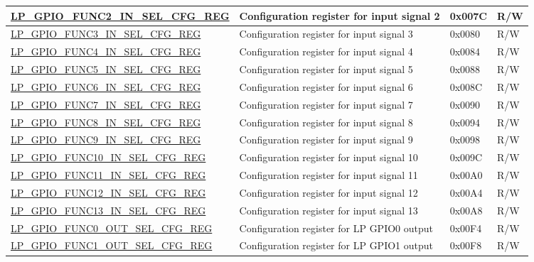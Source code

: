 \begin{longtable}{ | p{6.2cm} | p{6.9cm} | p{1.3cm} | p{1.8cm} | }
\hyperref[regdesc:LPGPIOFUNCNINSELCFGREG]{LP\_GPIO\_FUNC2\_IN\_SEL\_CFG\_REG} & Configuration register for input signal 2 & 0x007C & R/W \\ \hline
\hyperref[regdesc:LPGPIOFUNCNINSELCFGREG]{LP\_GPIO\_FUNC3\_IN\_SEL\_CFG\_REG} & Configuration register for input signal 3 & 0x0080 & R/W \\ \hline
\hyperref[regdesc:LPGPIOFUNCNINSELCFGREG]{LP\_GPIO\_FUNC4\_IN\_SEL\_CFG\_REG} & Configuration register for input signal 4 & 0x0084 & R/W \\ \hline
\hyperref[regdesc:LPGPIOFUNCNINSELCFGREG]{LP\_GPIO\_FUNC5\_IN\_SEL\_CFG\_REG} & Configuration register for input signal 5 & 0x0088 & R/W \\ \hline
\hyperref[regdesc:LPGPIOFUNCNINSELCFGREG]{LP\_GPIO\_FUNC6\_IN\_SEL\_CFG\_REG} & Configuration register for input signal 6 & 0x008C & R/W \\ \hline
\hyperref[regdesc:LPGPIOFUNCNINSELCFGREG]{LP\_GPIO\_FUNC7\_IN\_SEL\_CFG\_REG} & Configuration register for input signal 7 & 0x0090 & R/W \\ \hline
\hyperref[regdesc:LPGPIOFUNCNINSELCFGREG]{LP\_GPIO\_FUNC8\_IN\_SEL\_CFG\_REG} & Configuration register for input signal 8 & 0x0094 & R/W \\ \hline
\hyperref[regdesc:LPGPIOFUNCNINSELCFGREG]{LP\_GPIO\_FUNC9\_IN\_SEL\_CFG\_REG} & Configuration register for input signal 9 & 0x0098 & R/W \\ \hline
\hyperref[regdesc:LPGPIOFUNCNINSELCFGREG]{LP\_GPIO\_FUNC10\_IN\_SEL\_CFG\_REG} & Configuration register for input signal 10 & 0x009C & R/W \\ \hline
\hyperref[regdesc:LPGPIOFUNCNINSELCFGREG]{LP\_GPIO\_FUNC11\_IN\_SEL\_CFG\_REG} & Configuration register for input signal 11 & 0x00A0 & R/W \\ \hline
\hyperref[regdesc:LPGPIOFUNCNINSELCFGREG]{LP\_GPIO\_FUNC12\_IN\_SEL\_CFG\_REG} & Configuration register for input signal 12 & 0x00A4 & R/W \\ \hline
\hyperref[regdesc:LPGPIOFUNCNINSELCFGREG]{LP\_GPIO\_FUNC13\_IN\_SEL\_CFG\_REG} & Configuration register for input signal 13 & 0x00A8 & R/W \\ \hline
\hyperref[regdesc:LPGPIOFUNCNOUTSELCFGREG]{LP\_GPIO\_FUNC0\_OUT\_SEL\_CFG\_REG} & Configuration register for LP GPIO0 output & 0x00F4 & R/W \\ \hline
\hyperref[regdesc:LPGPIOFUNCNOUTSELCFGREG]{LP\_GPIO\_FUNC1\_OUT\_SEL\_CFG\_REG} & Configuration register for LP GPIO1 output & 0x00F8 & R/W \\ \hline

\end{longtable}
